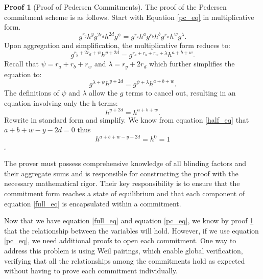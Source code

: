 \documentclass{iacrcc}
\theoremstyle{definition}
\newtheorem{namedproof}{Proof}
\begin{document}
\begin{namedproof}[Proof of Pedersen Commitments]
\label{commitment_proof}
The proof of the Pedersen commitment scheme is as follows. Start with Equation \ref{pc_eq} in multiplicative form.
\begin{equation}
g^{r_{y}} h^{y} g^{2 r_{d}} h^{2 d} g^{\psi} = g^{r_{a}} h^{a} g^{r_{b}} h^{b} g^{r_{w}} h^{w} g^{\lambda}.
\end{equation}
Upon aggregation and simplification, the multiplicative form reduces to:
\begin{equation}
\label{full_form}
g^{r_{y} + 2 r_{d} + \psi} h^{y + 2 d}  = g^{r_{a} + r_{b} + r_{w} + \lambda}  h^{a + b + w}.
\end{equation}
Recall that \( \psi = r_{a} + r_{b} + r_{w} \) and \( \lambda = r_{y} + 2r_{d} \) which further simplifies the equation to:
\begin{equation}
g^{\lambda + \psi} h^{y + 2 d}  = g^{\psi + \lambda}  h^{a + b + w}.
\end{equation}
The definitions of \( \psi \) and \( \lambda \) allow the \( g \) terms to cancel out, resulting in an equation involving only the h terms:
\begin{equation}
h^{y + 2 d} = h^{a + b + w}.
\end{equation}
Rewrite in standard form and simplify. We know from equation \ref{half_eq} that $a + b + w - y - 2d = 0$ thus
\begin{equation}
h^{a + b + w - y - 2 d} = h^{0} = 1
\end{equation}
\begin{center}
\( \square \)
\end{center} 
\end{namedproof}

The prover must possess comprehensive knowledge of all blinding factors and their aggregate sums and is responsible for constructing the proof with the necessary mathematical rigor. Their key responsibility is to ensure that the commitment form reaches a state of equilibrium and that each component of equation \ref{full_eq} is encapsulated within a commitment.

Now that we have equation \ref{full_eq} and equation \ref{pc_eq}, we know by proof \ref{commitment_proof} that the relationship between the variables will hold. However, if we use equation \ref{pc_eq}, we need additional proofs to open each commitment. One way to address this problem is using Weil pairings, which enable global verification, verifying that all the relationships among the commitments hold as expected without having to prove each commitment individually.
\end{document}

